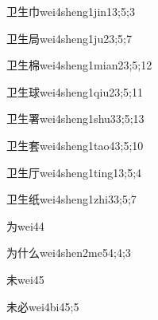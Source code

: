 \begin{verbete}{卫生巾}{wei4sheng1jin1}{3;5;3}
\end{verbete}

\begin{verbete}{卫生局}{wei4sheng1ju2}{3;5;7}
\end{verbete}

\begin{verbete}{卫生棉}{wei4sheng1mian2}{3;5;12}
\end{verbete}

\begin{verbete}{卫生球}{wei4sheng1qiu2}{3;5;11}
\end{verbete}

\begin{verbete}{卫生署}{wei4sheng1shu3}{3;5;13}
\end{verbete}

\begin{verbete}{卫生套}{wei4sheng1tao4}{3;5;10}
\end{verbete}

\begin{verbete}{卫生厅}{wei4sheng1ting1}{3;5;4}
\end{verbete}

\begin{verbete}{卫生纸}{wei4sheng1zhi3}{3;5;7}
\end{verbete}

\begin{verbete}{为}{wei4}{4}
\end{verbete}

\begin{verbete}{为什么}{wei4shen2me5}{4;4;3}
\end{verbete}

\begin{verbete}{未}{wei4}{5}
\end{verbete}

\begin{verbete}{未必}{wei4bi4}{5;5}
\end{verbete}

